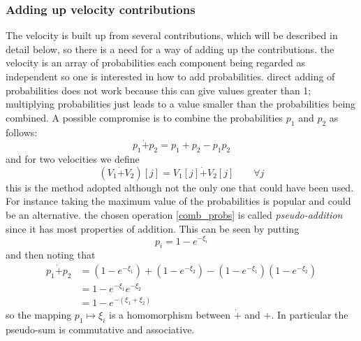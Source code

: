 \documentclass[a4paper,oneside,english]{book}
\numberwithin{equation}{section}
\numberwithin{figure}{section}
\begin{document}
\subsubsection{Adding up velocity contributions}
The velocity is built up from several contributions, which will be described in detail below, so there is a need for a way of adding up the contributions. the velocity is an array of probabilities each component being regarded as independent so one is interested in how to add probabilities. direct adding of probabilities does not work because this can give values greater than 1; multiplying probabilities just leads to a value smaller  than the probabilities being combined. A possible compromise is to combine the probabilities  $p_1$ and $p_2$ as follows:
\begin{equation}\label{comb_probs}
p_1\dot{+}p_2= p_1+p_2-p_1p_2
\end{equation}
and for two velocities we define
\begin{equation}\label{vel-add}
(V_1\dot{+}V_2)[j]=V_1[j]\dot{+}V_2[j] \qquad \forall j
\end{equation}       
this is the method adopted although not the only one that could have been used. For instance taking the maximum value of the probabilities is popular and could be an alternative. the chosen operation \eqref{comb_probs} is called \emph{pseudo-addition} since it has most properties of addition. This can be seen  by putting 
\begin{equation}\label{add-map}
p_i=1-e^{-\xi_i}
\end{equation}
and then noting that
\begin{align}
p_1\dot{+}p_2&=(1-e^{-\xi_1})+(1-e^{-\xi_2})-(1-e^{-\xi_1})(1-e^{-\xi_2})\\
&=1-e^{-\xi_1}e^{-\xi_2}\\
&=1-e^{-(\xi_1+\xi_2)}
\end{align} 
so the mapping $p_1 \mapsto \xi_i$ is a homomorphism between $\dot{+}$ and  $+$. In particular the pseudo-sum is commutative and associative.
\end{document}
